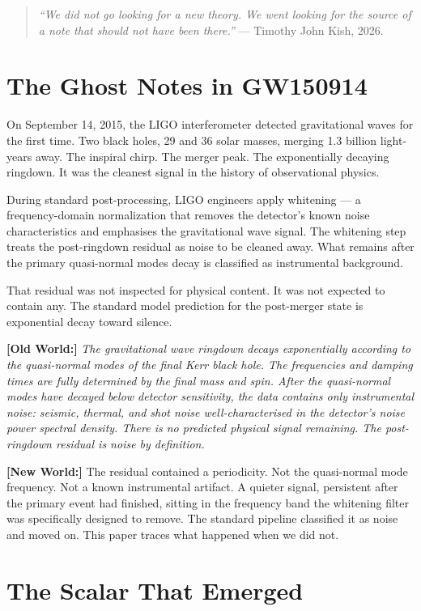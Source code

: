 \documentclass[11pt, letterpaper, openany]{book}
\newcommand{\oldworld}[1]{\noindent\textbf{\color{goldseal}[Old World:]}
  \textit{#1}\medskip}
\newcommand{\newworld}[1]{\noindent\textbf{\color{kishblue}[New World:]}
  #1\medskip}
\begin{document}
\begin{quote}
\textit{``We did not go looking for a new theory. We went looking for
the source of a note that should not have been there.''} ---
Timothy John Kish, 2026.
\end{quote}

\section{The Ghost Notes in GW150914}

On September 14, 2015, the LIGO interferometer detected gravitational
waves for the first time. Two black holes, 29 and 36 solar masses, merging
1.3 billion light-years away. The inspiral chirp. The merger peak. The
exponentially decaying ringdown. It was the cleanest signal in the
history of observational physics.

During standard post-processing, LIGO engineers apply whitening ---
a frequency-domain normalization that removes the detector's known
noise characteristics and emphasises the gravitational wave signal.
The whitening step treats the post-ringdown residual as noise to be
cleaned away. What remains after the primary quasi-normal modes
decay is classified as instrumental background.

That residual was not inspected for physical content. It was not
expected to contain any. The standard model prediction for the
post-merger state is exponential decay toward silence.

\oldworld{The gravitational wave ringdown decays exponentially according
to the quasi-normal modes of the final Kerr black hole. The frequencies
and damping times are fully determined by the final mass and spin.
After the quasi-normal modes have decayed below detector sensitivity,
the data contains only instrumental noise: seismic, thermal, and shot
noise well-characterised in the detector's noise power spectral density.
There is no predicted physical signal remaining. The post-ringdown
residual is noise by definition.}

\newworld{The residual contained a periodicity. Not the quasi-normal
mode frequency. Not a known instrumental artifact. A quieter signal,
persistent after the primary event had finished, sitting in the frequency
band the whitening filter was specifically designed to remove. The standard
pipeline classified it as noise and moved on. This paper traces what
happened when we did not.}

\section{The Scalar That Emerged}
\end{document}
